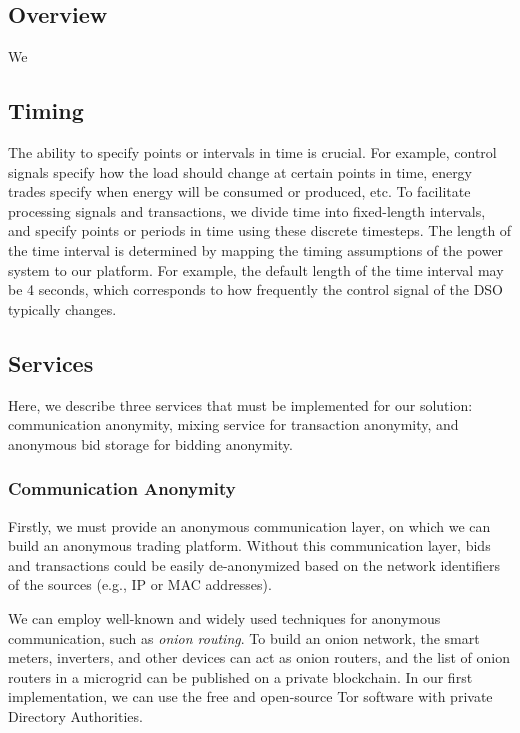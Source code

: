 \subsection{Overview}
We

\subsection{Timing}
The ability to specify points or intervals in time is crucial.
For example, control signals specify how the load should change at certain points in time, energy trades specify when energy will be consumed or produced, etc.
To facilitate processing signals and transactions, we divide time into fixed-length intervals, and specify points or periods in time using these discrete timesteps.
The length of the time interval is determined by mapping the timing assumptions of the power system to our platform.
For example, the default length of the time interval may be 4 seconds, which corresponds to how frequently the control signal of the DSO typically changes.

\subsection{Services}

Here, we describe three services that must be implemented for our solution: communication anonymity, mixing service for transaction anonymity, and anonymous bid storage for bidding anonymity.

\subsubsection{Communication Anonymity}
Firstly, we must provide an anonymous communication layer, on which we can build an anonymous trading platform.
Without this communication layer, bids and transactions could be easily de-anonymized based on the network identifiers of the sources (e.g., IP or MAC addresses).

We can employ well-known and widely used techniques for anonymous communication, such as \emph{onion routing}.
To build an onion network, the smart meters, inverters, and other devices can act as onion routers, and the list of onion routers in a microgrid can be published on a private blockchain.
In our first implementation, we can use the free and open-source Tor software with private Directory Authorities.

